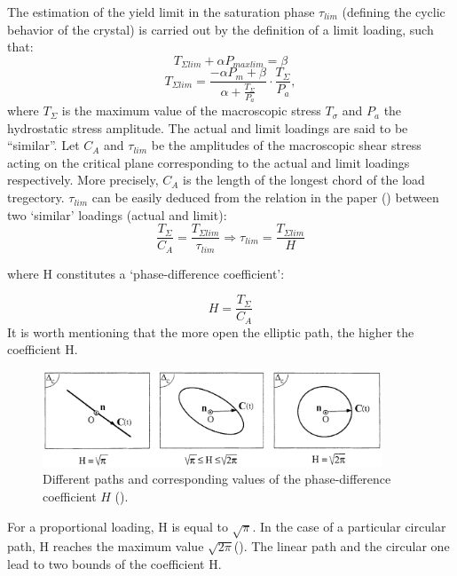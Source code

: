 The estimation of the yield limit in the saturation phase $\tau_{lim}$ (defining the cyclic behavior of the crystal) is
carried out by the definition of a limit loading, such that:
\begin{equation}
T_{\Sigma lim}+\alpha P_{max lim}=\beta
\end{equation}
\begin{equation}
T_{\Sigma lim}=\frac{-\alpha P_m+\beta}{\alpha+\frac{T_\Sigma}{P_a}}\cdot\frac{T_\Sigma}{P_a},
\label{Tlim}
\end{equation}
where $T_{\Sigma}$ is the maximum value of the macroscopic stress $T_{\sigma}$ and $P_a$ the hydrostatic stress amplitude.
The actual and limit loadings are said to be ``similar''. Let $C_A$ and $\tau_{lim}$ be the amplitudes of the macroscopic
shear stress acting on the critical plane corresponding to
the actual and limit loadings respectively. More precisely, $C_A$ is the length of the longest chord of the load tregectory. $\tau_{lim}$ can be
easily deduced from the relation in the paper (\cite{morel1998fatigue}) between two ‘similar’ loadings (actual
and limit):
$$\dfrac{T_{\Sigma}}{C_A}=\dfrac{T_{\Sigma lim}}{\tau_{lim}}\Rightarrow\tau_{lim}=\dfrac{T_{\Sigma lim}}{H}$$

where H constitutes a ‘phase-difference coefficient’:

\begin{equation}
H=\frac{T_{\Sigma}}{C_A}
\label{eqH}
\end{equation}
It is worth mentioning that the more open the elliptic
path, the higher the coefficient H.  

\begin{figure}[h!]
	\centering
	\includegraphics[width=0.9\textwidth]{figures//H.png} 
	\caption{Different paths and corresponding values of the phase-difference coefficient $H$ (\cite{Morel2000101}).}
	\label{figH}
\end{figure}
For a proportional
loading, H is equal to $\sqrt{\pi}$. In the case of a particular
circular path, H reaches the maximum value $\sqrt{2\pi}$(). 
The linear path and the circular one lead to two bounds of
the coefficient H.

